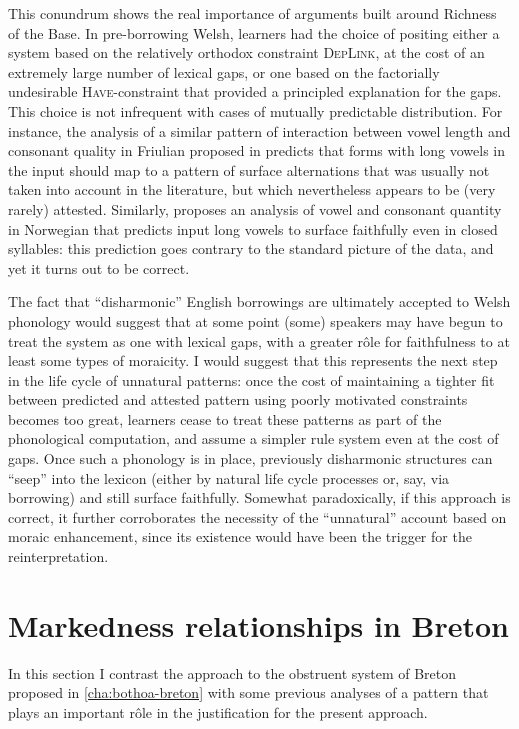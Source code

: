 This conundrum shows the real importance of arguments built around Richness of the Base. In pre\hyp borrowing Welsh, learners had the choice of positing either a system based on the relatively orthodox constraint \textsc{DepLink}, at the cost of an extremely large number of lexical gaps, or one based on the factorially undesirable \textsc{Have}-\mo constraint that provided a principled explanation for the gaps. This choice is not infrequent with cases of mutually predictable distribution. For instance, the analysis of a similar pattern of interaction between vowel length and consonant quality in Friulian proposed in \citet{iosaded:_final_italy} predicts that forms with long vowels in the input should map to a pattern of surface alternations that was usually not taken into account in the literature, but which nevertheless appears to be (very rarely) attested. Similarly, \citet{rice06:_norweg} proposes an analysis of vowel and consonant quantity in Norwegian that predicts input long vowels to surface faithfully even in closed syllables: this prediction goes contrary to the standard picture of the data, and yet it turns out to be correct.

The fact that \enquote{disharmonic} English borrowings are ultimately accepted to Welsh phonology would suggest that at some point (some) speakers may have begun to treat the system as one with lexical gaps, with a greater rôle for faithfulness to at least some types of moraicity. I would suggest that this represents the next step in the life cycle of unnatural patterns: once the cost of maintaining a tighter fit between predicted and attested pattern using poorly motivated constraints becomes too great, learners cease to treat these patterns as part of the phonological computation, and assume a simpler rule system even at the cost of gaps. Once such a phonology is in place, previously disharmonic structures can \enquote{seep} into the lexicon (either by natural life cycle processes or, say, via borrowing) and still surface faithfully. Somewhat paradoxically, if this approach is correct, it further corroborates the necessity of the \enquote{unnatural} account based on moraic enhancement, since its existence would have been the trigger for the reinterpretation.

\section{Markedness relationships in Breton}
\label{sec:mark-relat-bret}

In this section I contrast the approach to the obstruent system of Breton proposed in \cref{cha:bothoa-breton} with some previous analyses of a pattern that plays an important rôle in the justification for the present approach.

